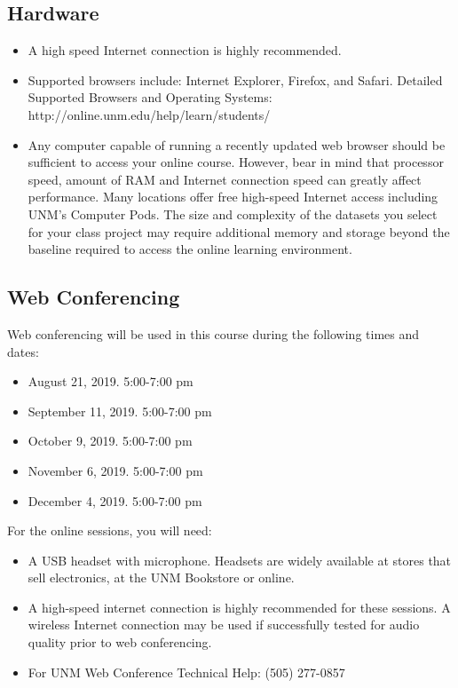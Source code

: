 \documentclass[
]{article}
\providecommand{\tightlist}{%
  \setlength{\itemsep}{0pt}\setlength{\parskip}{0pt}}
\begin{document}
\hypertarget{hardware}{%
\subsection{Hardware}\label{hardware}}

\begin{itemize}
\tightlist
\item
  A high speed Internet connection is highly recommended.
\item
  Supported browsers include: Internet Explorer, Firefox, and Safari.
  Detailed Supported Browsers and Operating Systems:
  http://online.unm.edu/help/learn/students/
\item
  Any computer capable of running a recently updated web browser should
  be sufficient to access your online course. However, bear in mind that
  processor speed, amount of RAM and Internet connection speed can
  greatly affect performance. Many locations offer free high-speed
  Internet access including UNM's Computer Pods. The size and complexity
  of the datasets you select for your class project may require
  additional memory and storage beyond the baseline required to access
  the online learning environment.
\end{itemize}

\hypertarget{web-conferencing}{%
\subsection{Web Conferencing}\label{web-conferencing}}

Web conferencing will be used in this course during the following times
and dates:

\begin{itemize}
\tightlist
\item
  August 21, 2019. 5:00-7:00 pm
\item
  September 11, 2019. 5:00-7:00 pm
\item
  October 9, 2019. 5:00-7:00 pm
\item
  November 6, 2019. 5:00-7:00 pm
\item
  December 4, 2019. 5:00-7:00 pm
\end{itemize}

For the online sessions, you will need:

\begin{itemize}
\tightlist
\item
  A USB headset with microphone. Headsets are widely available at stores
  that sell electronics, at the UNM Bookstore or online.
\item
  A high-speed internet connection is highly recommended for these
  sessions. A wireless Internet connection may be used if successfully
  tested for audio quality prior to web conferencing.
\item
  For UNM Web Conference Technical Help: (505) 277-0857
\end{itemize}
\end{document}
